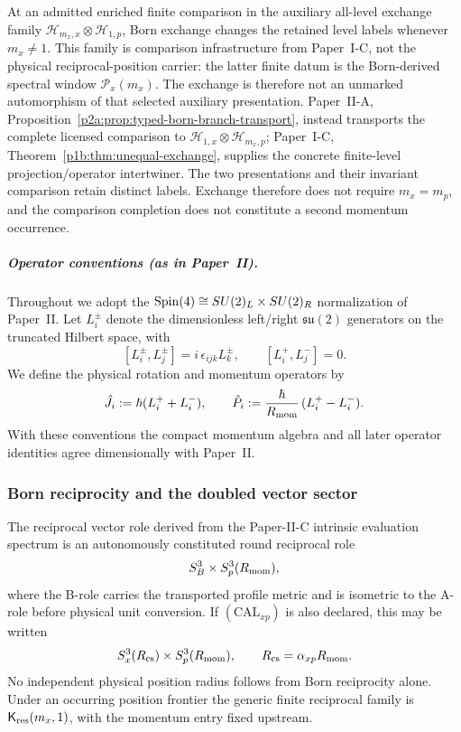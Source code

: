 \documentclass[12pt,a4paper]{article}
\begin{document}
At an admitted enriched finite comparison in the auxiliary all-level exchange family
\(\mathcal H_{m_x,x}\otimes\mathcal H_{1,p}\), Born exchange changes the
retained level labels whenever \(m_x\neq1\).  This family is comparison
infrastructure from Paper~I-C, not the physical reciprocal-position carrier:
the latter finite datum is the Born-derived spectral window
\(\mathcal P_x(m_x)\).  The exchange is therefore not an
unmarked automorphism of that selected auxiliary presentation.  Paper~II-A,
Proposition~\ref{p2a:prop:typed-born-branch-transport}, instead transports
the complete licensed comparison to
\(\mathcal H_{1,x}\otimes\mathcal H_{m_x,p}\); Paper~I-C,
Theorem~\ref{p1b:thm:unequal-exchange}, supplies the concrete finite-level
projection/operator intertwiner.  The two presentations and their invariant
comparison retain distinct labels.  Exchange therefore does not require
\(m_x=m_p\), and the comparison completion does not constitute a second
momentum occurrence.





\subparagraph{Operator conventions (as in Paper~II).}
Throughout we adopt the \(\mathrm{Spin}(4)\cong SU(2)_L\times SU(2)_R\) normalization of Paper~II.
Let \(L_i^\pm\) denote the dimensionless left/right \(\mathfrak{su}(2)\) generators on the truncated Hilbert space, with
\[
[L_i^\pm,L_j^\pm]=i\,\epsilon_{ijk}L_k^\pm,\qquad
[L_i^+,L_j^-]=0.
\]
We define the physical rotation and momentum operators by
\begin{equation}
\hat J_i:=\hbar(L_i^+ + L_i^-),
\qquad
\hat P_i:=\frac{\hbar}{R_{\mathrm{mom}}}\,(L_i^+ - L_i^-).
\end{equation}
With these conventions the compact momentum algebra and all later operator identities agree dimensionally with Paper~II.

\subsubsection{Born reciprocity and the doubled vector sector}

\begin{lemma}
\label{p3:lem:born}
The reciprocal vector role derived from the Paper-II-C intrinsic evaluation
spectrum is an autonomously constituted round reciprocal role
\[
   S^3_B\times S^3_p(R_{\mathrm{mom}}),
\]
where the B-role carries the transported profile metric and is isometric to the
A-role before physical unit conversion.  If \((\mathrm{CAL}_{xp})\) is also
declared, this may be written
\[
   S^3_x(R_{\mathrm{cs}})\times S^3_p(R_{\mathrm{mom}}),\qquad
   R_{\mathrm{cs}}=\alpha_{xp}R_{\mathrm{mom}}.
\]
No independent physical position radius follows from Born reciprocity alone.
Under an occurring position frontier the generic finite reciprocal family is
$\mathsf K_{\rm res}(m_x,1)$, with the momentum entry fixed upstream.
\end{lemma}
\end{document}
